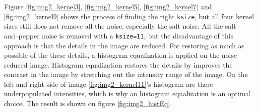Figure \ref{fig:img2_kernel3}, \ref{fig:img2_kernel5}, \ref{fig:img2_kernel7} and \ref{fig:img2_kernel9} shows the process of finding the right \lstinline|ksize|, but all four kernel sizes still does not remove all the noise, especially the salt noise. All the salt--and--pepper noise is removed with a \lstinline|ksize=11|, but the disadvantage of this approach is that the details in the image are reduced. For restoring as much as possible of the these details, a histogram equalization is applied on the noise reduced image. Histogram equalization restores the details by improves the contrast in the image by stretching out the intensity range of the image. On the left and right side of image \ref{fig:img2_kernel11}'s histogram are there underpopulated intensities, which is why an histogram equalization is an optimal choice. The result is shown on figure \ref{fig:img2_histEq}.
